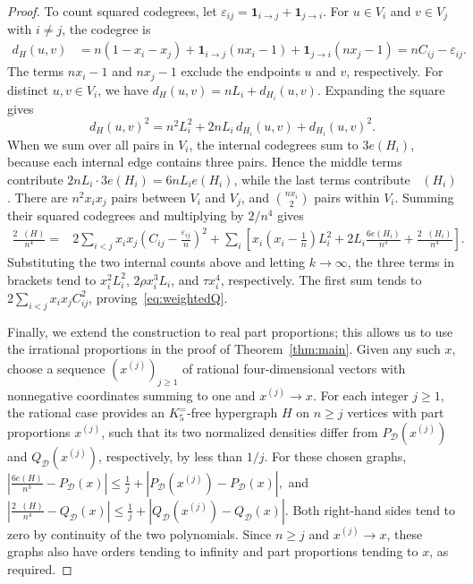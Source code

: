 \documentclass[11pt]{article}
\theoremstyle{remark}
\numberwithin{equation}{section}
\DeclareMathOperator{\co}{co_2}
\newcommand{\F}{K_5^{=}}
\begin{document}
\begin{proof}
To count squared codegrees, let
$\varepsilon_{ij}=\mathbf1_{i\to j}+\mathbf1_{j\to i}$.
For $u\in V_i$ and $v\in V_j$ with $i\ne j$, the codegree is
\[
\begin{aligned}
 d_H(u,v)&=n(1-x_i-x_j)
       +\mathbf1_{i\to j}(nx_i-1)+\mathbf1_{j\to i}(nx_j-1)
        =nC_{ij}-\varepsilon_{ij}.
\end{aligned}
\]
The terms $nx_i-1$ and $nx_j-1$ exclude the endpoints $u$ and $v$,
respectively. For distinct $u,v\in V_i$, we have
$d_H(u,v)=nL_i+d_{H_i}(u,v)$.
Expanding the square gives
\[
 d_H(u,v)^2=n^2L_i^2+2nL_i\,d_{H_i}(u,v)+d_{H_i}(u,v)^2.
\]
When we sum over all pairs in $V_i$, the internal codegrees sum to
$3e(H_i)$, because each internal edge contains three pairs. Hence the
middle terms contribute $2nL_i\cdot3e(H_i)=6nL_i e(H_i)$, while the
last terms contribute $\co(H_i)$.
There are $n^2x_ix_j$ pairs between $V_i$
and $V_j$, and $\binom{nx_i}{2}$ pairs within $V_i$. Summing their
squared codegrees and multiplying by $2/n^4$ gives
\begin{equation*}
\begin{split}
 \frac{2\co(H)}{n^4}
   ={}&2\sum_{i<j}x_ix_j\left(C_{ij}-\frac{\varepsilon_{ij}}n\right)^2
     +\sum_i\left[
       x_i\left(x_i-\frac1n\right)L_i^2
       +2L_i\frac{6e(H_i)}{n^3}
       +\frac{2\co(H_i)}{n^4}\right].
\end{split}
\end{equation*}
Substituting the two internal counts above and letting $k\to\infty$,
the three terms in brackets tend to $x_i^2L_i^2$,
$2\rho x_i^3L_i$, and $\tau x_i^4$, respectively. The first sum tends
to $2\sum_{i<j}x_ix_jC_{ij}^2$, proving~\eqref{eq:weightedQ}.

Finally, we extend the construction to real part proportions; this
allows us to use the irrational proportions in the proof of
Theorem~\ref{thm:main}. Given any such $x$, choose a sequence
$(x^{(j)})_{j\ge1}$ of rational four-dimensional vectors with nonnegative
coordinates summing to one and $x^{(j)}\to x$.
For each integer $j\ge1$, the rational case provides an $\F$-free
hypergraph $H$ on $n\ge j$ vertices with part proportions $x^{(j)}$,
such that its two normalized densities differ from
$P_{\mathcal D}(x^{(j)})$ and $Q_{\mathcal D}(x^{(j)})$, respectively,
by less than $1/j$. For these chosen graphs,
\(
 \left|\frac{6e(H)}{n^3}-P_{\mathcal D}(x)\right|
\le\frac1j+\left|P_{\mathcal D}(x^{(j)})-P_{\mathcal D}(x)\right|,
 \)
 and
 \(
 \left|\frac{2\co(H)}{n^4}-Q_{\mathcal D}(x)\right|
\le\frac1j+\left|Q_{\mathcal D}(x^{(j)})-Q_{\mathcal D}(x)\right|.
\)
Both right-hand sides tend to zero by continuity of the two polynomials.
Since $n\ge j$ and $x^{(j)}\to x$, these graphs also have orders tending
to infinity and part proportions tending to $x$, as required.
\end{proof}
\end{document}
